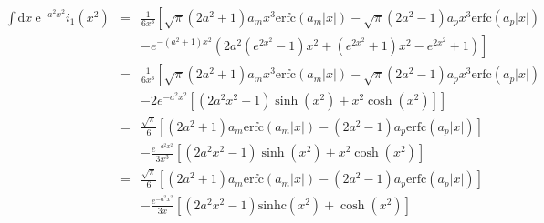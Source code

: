 \documentclass[paper=a4, fontsize=11pt]{article} %
\numberwithin{equation}{section} %
\numberwithin{figure}{section} %
\numberwithin{table}{section} %
\newcommand{\re}{{\mathrm{e}}}
\newcommand{\rerfc}{{\mathrm{erfc}}}
\newcommand{\rd}{{\mathrm{d}}}
\newcommand{\sinhc}{\mathrm{sinhc}}
\begin{document}
\begin{eqnarray}
\int \rd x\ \re^{-a^2x^2}i_{1}(x^2)&=& \frac{1}{6x^3} 
\left [
    \sqrt{\pi} (2 a^2 + 1)a_m x^3 \rerfc(a_m |x|)  - \sqrt{\pi} (2 a^2 - 1)a_p x^3 \rerfc(a_p|x|)
\right. \nonumber \\
& &  \left.  - e^{-(a^2+1) x^2} (2 a^2 (e^{2 x^2} - 1) x^2 + (e^{2 x^2} + 1) x^2 - e^{2 x^2} + 1) 
    \right ] \nonumber \\
&=& \frac{1}{6x^3} 
\left [
    \sqrt{\pi} (2 a^2 + 1)a_m x^3 \rerfc(a_m |x|)  - \sqrt{\pi} (2 a^2 - 1)a_p x^3 \rerfc(a_p|x|)
\right. \nonumber \\
& &  \left.  -2e^{-a^2x^2} \left [ (2a^2x^2-1)\sinh(x^2) + x^2\cosh(x^2)\right ]
    \right ] \nonumber \\
&=& \frac{\sqrt{\pi}}{6}\left [ (2 a^2 + 1)a_m \rerfc(a_m |x|)  - (2 a^2 - 1)a_p \rerfc(a_p|x|) \right ]
\nonumber \\
& &  -\frac{e^{-a^2x^2}}{3x^3}\left [ (2a^2x^2-1)\sinh(x^2) + x^2\cosh(x^2)\right ] \nonumber \\
&=& \frac{\sqrt{\pi}}{6}\left [ (2 a^2 + 1)a_m \rerfc(a_m |x|)  - (2 a^2 - 1)a_p \rerfc(a_p|x|) 
   \right ] \nonumber \\
& &  -\frac{e^{-a^2x^2}}{3x}\left [ (2a^2x^2-1)\sinhc(x^2) + \cosh(x^2)\right ]
\end{eqnarray}
\end{document}
